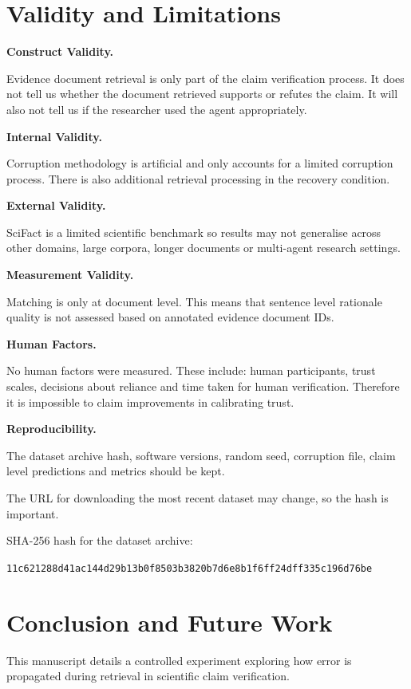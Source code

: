 \documentclass[11pt,a4paper]{article}
\begin{document}
\section{Validity and Limitations}

\textbf{Construct Validity.}

Evidence document retrieval is only part of the claim verification process. It does not tell us whether the document retrieved supports or refutes the claim. It will also not tell us if the researcher used the agent appropriately.

\textbf{Internal Validity.}

Corruption methodology is artificial and only accounts for a limited corruption process. There is also additional retrieval processing in the recovery condition.

\textbf{External Validity.}

SciFact is a limited scientific benchmark so results may not generalise across other domains, large corpora, longer documents or multi-agent research settings.

\textbf{Measurement Validity.}

Matching is only at document level. This means that sentence level rationale quality is not assessed based on annotated evidence document IDs.

\textbf{Human Factors.}

No human factors were measured. These include: human participants, trust scales, decisions about reliance and time taken for human verification. Therefore it is impossible to claim improvements in calibrating trust.

\textbf{Reproducibility.}

The dataset archive hash, software versions, random seed, corruption file, claim level predictions and metrics should be kept.

The URL for downloading the most recent dataset may change, so the hash is important.

SHA-256 hash for the dataset archive:

\texttt{11c621288d41ac144d29b13b0f8503b3820b7d6e8b1f6ff24dff335c196d76be}

\section{Conclusion and Future Work}

This manuscript details a controlled experiment exploring how error is propagated during retrieval in scientific claim verification.
\end{document}
